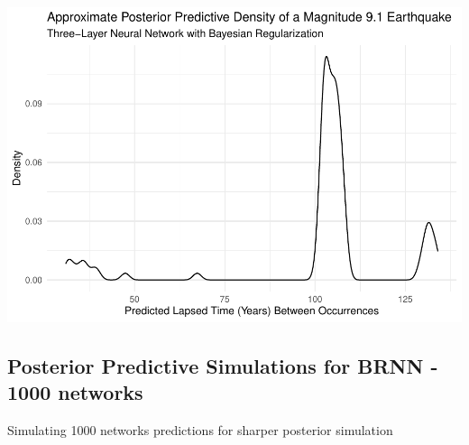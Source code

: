 \begin{Shaded}
\begin{Highlighting}[]
\NormalTok{(} \SpecialCharTok{/}\SpecialCharTok{\^{}}\SpecialCharTok{+}
\NormalTok{() }\SpecialCharTok{+} 
    \NormalTok{(} \NormalTok{,}
          \NormalTok{,}
          \NormalTok{,}
          \NormalTok{) }\SpecialCharTok{+}
  \NormalTok{()}
\end{Highlighting}
\end{Shaded}

\includegraphics[width =.6\linewidth]
{earthquakes_files/figure-latex/unnamed-chunk-14-2.pdf}

\hypertarget{posterior-predictive-simulations-for-brnn---1000-networks}{%
\subsection{Posterior Predictive Simulations for BRNN - 1000
networks}\label{posterior-predictive-simulations-for-brnn---1000-networks}}

Simulating 1000 networks predictions for sharper posterior simulation

